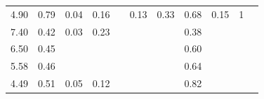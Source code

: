 \documentclass[10pt,a4paper]{article}
\begin{document}
\begin{table}
\begin{tabular}{@{}ccccccccccc@{}}
		4.90                                                         & 0.79                                                & 0.04                                                & 0.16                                                &                                                     & 0.13                                                 & 0.33                                                & 0.68                                                  & 0.15                                                    & 1                                                    & \cite{WRAP}                                                                              \\
		7.40                                                         & 0.42                                                & 0.03                                                & 0.23                                                &                                                     &                                                      &                                                     & 0.38                                                  &                                                         &                                                      & \cite{ADAS}            \\
		6.50                                                         & 0.45                                                &                                                     &                                                     &                                                     &                                                      &                                                     & 0.60                                                  &                                                         &                                                      & \cite{ADAS}            \\
		5.58                                                         & 0.46                                                &                                                     &                                                     &                                                     &                                                      &                                                     & 0.64                                                  &                                                         &                                                      & \cite{ADAS}            \\
		4.49                                                         & 0.51                                                & 0.05                                                & 0.12                                                &                                                     &                                                      &                                                     & 0.82                                                  &                                                         &                                                      & \cite{ADAS}            \\

\end{tabular}
\end{table}
\end{document}
